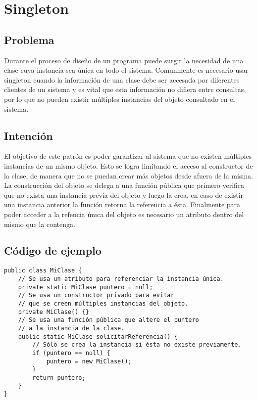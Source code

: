 


\section{Singleton}

\subsection{Problema}

Durante el proceso de diseño de un programa puede surgir la necesidad de una clase cuya instancia sea única en todo el sistema. Comunmente es necesario usar singleton cuando la información de una clase debe ser accesada por diferentes clientes de un sistema y es vital que esta información no difiera entre consultas, por lo que no pueden existir múltiples instancias del objeto consultado en el sistema.

\subsection{Intención}

El objetivo de este patrón es poder garantizar al sistema que no existen múltiples instancias de un mismo objeto. Esto se logra limitando el acceso al constructor de la clase, de manera que no se puedan crear más objetos desde afuera de la misma. La construcción del objeto se delega a una función pública que primero verifica que no exista una instancia previa del objeto y luego la crea, en caso de existir una instancia anterior la función retorna la referencia a ésta. Finalmente para poder acceder a la refencia única del objeto es necesario un atributo dentro del mismo que la contenga.

\subsection{Código de ejemplo}

\begin{verbatim}
public class MiClase {
    // Se usa un atributo para referenciar la instancia única.
    private static MiClase puntero = null;
    // Se usa un constructor privado para evitar
    // que se creen múltiples instancias del objeto.
    private MiClase() {}
    // Se usa una función pública que altere el puntero 
    // a la instancia de la clase.
    public static MiClase solicitarReferencia() {
        // Sólo se crea la instancia si ésta no existe previamente.
        if (puntero == null) {
            puntero = new MiClase();
        }   
        return puntero;
    }
}
\end{verbatim}
 
